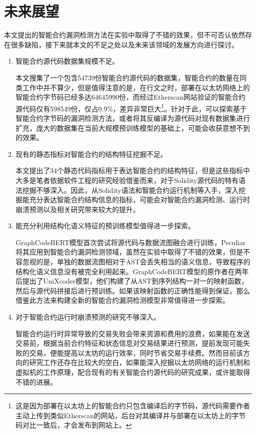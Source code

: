 \section{未来展望}
\label{sec:未来展望}

本文提出的智能合约漏洞检测方法在实验中取得了不错的效果，但不可否认依然存在很多缺陷，接下来就本文的不足之处以及未来该领域的发展方向进行探讨。

\begin{enumerate}[label=(\arabic*)]
    \item 智能合约源代码数据集规模不足。
    
    本文搜集了一个包含\num{54739}份智能合约源代码的数据集，智能合约的数量在同类工作中并不算少，但是值得注意的是，在行文之时，部署在以太坊网络上的智能合约字节码已经多达\num{64645990}份，而经过Etherscan网站验证的智能合约源代码仅有\num{598549}份，仅占0.9\%，差异非常巨大\footnote{这是因为部署在以太坊上的智能合约只包含编译后的字节码，源代码需要作者主动上传到类似Etherscan的网站，后台对其编译并与部署在以太坊上的字节码对比一致后，才会发布到网站上。}。针对于此，可以探索基于智能合约字节码的漏洞检测方法，或者将其反编译为源代码对现有数据集进行扩充，庞大的数据集在当前大规模预训练模型的基础上，可能会收获意想不到的效果。

    \item 现有的静态指标对智能合约的结构特征挖掘不足。
    
    本文提出了34个静态代码指标用于表达智能合约的结构特征，但是这些指标中大多是笔者依据软件工程的研究经验借鉴而来，对于Solidity源代码的特有语法挖掘不够深入。因此，从Solidity语法和智能合约运行机制等入手，深入挖掘能充分表达智能合约结构信息的指标，可能会对智能合约漏洞检测、运行时崩溃预测以及相关研究带来较大的提升。
    
    \item 能充分利用结构化语义特征的预训练模型值得进一步探索。
    
    GraphCodeBERT\cite{guo2020graphcodebert}模型首次尝试将源代码与数据流图融合进行训练，Peculiar\cite{wu2021peculiar}将其应用到智能合约漏洞检测领域，虽然在实验中取得了不错的效果，但是不容忽视的是，单独的数据流图相对于AST会丢失相当的语义信息，导致程序的结构化语义信息没有被完全利用起来。GraphCodeBERT模型的原作者在两年后提出了UniXcoder模型，他们构建了从AST到序列结构一对一的映射函数，然后与源代码拼接后进行预训练。如果该映射函数的正确性能得到保证，那么借鉴此方法来构建全新的智能合约漏洞检测模型非常值得进一步探索。

    \item 对于智能合约运行时崩溃预测的研究不够深入。
    
    智能合约运行时异常导致的交易失败会带来资源和费用的浪费，如果能在发送交易前，根据当前合约特征和状态信息对交易结果进行预测，提前发现可能失败的交易，便能提高以太坊的运行效率，同时节省交易手续费。然而目前该方向的研究工作还存在比较大的空白，如果能深入挖掘以太坊网络的运行机制和虚拟机的工作原理，配合现有的有关智能合约源代码的研究成果，或许能取得不错的进展。
\end{enumerate}

